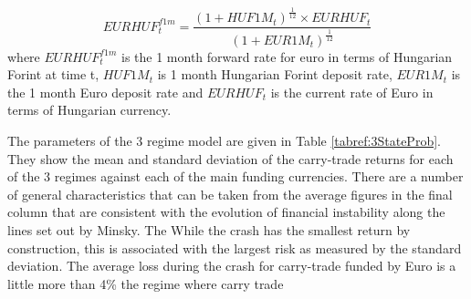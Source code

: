 \documentclass[12pt, a4paper, oneside]{article} %
\begin{document}
\begin{equation}\label{eqref:forward}
EURHUF_t^{f1m} = \frac{(1 + HUF1M_t)^{\frac{1}{12}} \times EURHUF_t }{(1 + EUR1M_t)^{\frac{1}{12}}}
\end{equation}
where  $EURHUF_t^{f1m}$ is the 1 month forward rate for euro in terms of Hungarian Forint at time t, $HUF1M_t$ is 1 month Hungarian Forint deposit rate, $EUR1M_t$ is the 1 month Euro deposit rate and $EURHUF_t$ is the current rate of Euro in terms of Hungarian currency.  



The parameters of the 3 regime model are given in Table \ref{tabref:3StateProb}.  They show the mean and standard deviation of the carry-trade returns for each of the 3 regimes against each of the main funding currencies.  There are a number of general characteristics that can be taken from the average figures in the final column that are consistent with the evolution of financial instability along the lines set out by Minsky.  The While the crash has the smallest return by construction, this is associated with the largest risk as measured by the standard deviation. The average loss during the crash for carry-trade funded by Euro is a little more than 4\%  the regime where carry trade 
\end{document}
